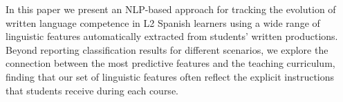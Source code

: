 In this paper we present an NLP-based approach for tracking the evolution of written language competence in L2 Spanish learners using a wide range of linguistic features automatically extracted from students' written productions. Beyond reporting classification results for different scenarios, we explore the connection between the most predictive features and the teaching curriculum, finding that our set of linguistic features often reflect the explicit instructions that students receive during each course.
